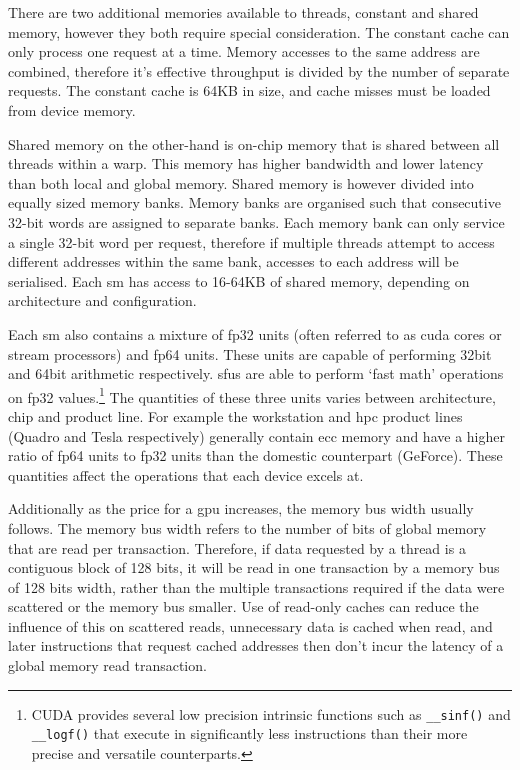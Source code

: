       There are two additional memories available to threads, constant and shared memory, however they both require special consideration. The constant cache can only process one request at a time. Memory accesses to the same address are combined, therefore it's effective throughput is divided by the number of separate requests. The constant cache is 64KB in size, and cache misses must be loaded from device memory.     
      
      Shared memory on the other-hand is \gls{on-chip} memory that is shared between all threads within a warp. This memory has higher bandwidth and lower latency than both local and global memory. Shared memory is however divided into equally sized memory banks. Memory banks are organised such that consecutive 32-bit words are assigned to separate banks. Each memory bank can only service a single 32-bit word per request, therefore if multiple threads attempt to access different addresses within the same bank, accesses to each address will be serialised. Each \gls{sm} has access to 16-64KB of shared memory, depending on architecture and configuration.
      
      Each \gls{sm} also contains a mixture of \gls{fp32} units (often referred to as \gls{cuda} cores or stream processors) and \gls{fp64} units. These units are capable of performing 32bit and 64bit arithmetic respectively. \glspl{sfu} are able to perform `fast math' operations on \gls{fp32} values.\footnote{CUDA provides several low precision intrinsic functions such as \lstinline!__sinf()! and \lstinline!__logf()! that execute in significantly less instructions than their more precise and versatile counterparts.} The quantities of these three units varies between architecture, chip and product line. For example the workstation and \gls{hpc} product lines (Quadro and Tesla respectively) generally contain \gls{ecc} memory and have a higher ratio of \gls{fp64} units to \gls{fp32} units than the domestic counterpart (GeForce). These quantities affect the operations that each device excels at.

      Additionally as the price for a \gls{gpu} increases, the memory bus width usually follows. The memory bus width refers to the number of bits of global memory that are read per transaction. Therefore, if data requested by a thread is a contiguous block of 128 bits, it will be read in one transaction by a memory bus of 128 bits width, rather than the multiple transactions required if the data were scattered or the memory bus smaller. Use of read-only caches can reduce the influence of this on scattered reads, unnecessary data is cached when read, and later instructions that request cached addresses then don't incur the latency of a global memory read transaction.
      
